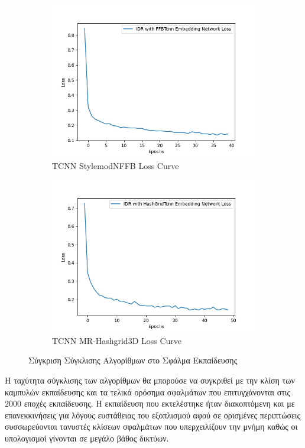 \begin{figure}[H]
\begin{subfigure}{0.3\textwidth}
        \includegraphics[width=\linewidth]{images/chapter5_img/LossPlots/Total_Loss_First_50-100_Epochs/loss_plot_FFBTcnn_EpochStamp40.jpg}
        \caption*{TCNN StylemodNFFB Loss Curve}
      \end{subfigure}
      \begin{subfigure}{0.3\textwidth}
        \includegraphics[width=\linewidth]{images/chapter5_img/LossPlots/Total_Loss_First_50-100_Epochs/loss_plot_HashGridTcnn_EpochStamp49.jpg}
        \caption*{TCNN MR-Hashgrid3D Loss Curve}
      \end{subfigure}
      \caption{Σύγκριση Σύγκλισης Αλγορίθμων στο Σφάλμα Εκπαίδευσης}
    \end{figure}
    H ταχύτητα σύγκλισης των αλγορίθμων θα μπορούσε να συγκριθεί με την κλίση των καμπυλών εκπαίδευσης και τα τελικά ορόσημα σφαλμάτων που επιτυγχάνονται στις 2000 εποχές εκπαίδευσης. Η εκπαίδευση που εκτελέστηκε ήταν διακοπτόμενη και με επανεκκινήσεις για λόγους ευστάθειας του εξοπλισμού αφού σε ορισμένες περιπτώσεις συσσωρεύονται τανυστές κλίσεων σφαλμάτων που υπερχειλίζουν την μνήμη καθώς οι υπολογισμοί γίνονται σε μεγάλο βάθος δικτύων. 
    \nobreak

